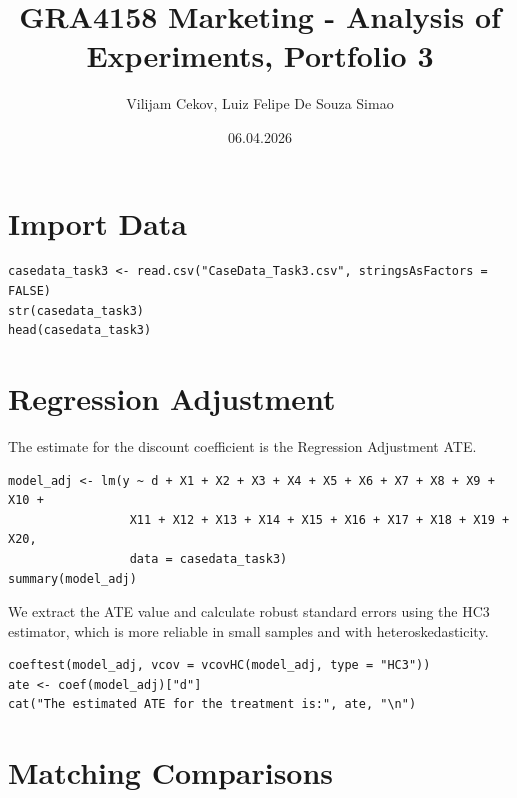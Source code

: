 \documentclass[12pt,a4paper]{article}
\title{GRA4158 Marketing - Analysis of Experiments, Portfolio 3}
\author{Vilijam Cekov, Luiz Felipe De Souza Simao}
\date{06.04.2026}
\begin{document}
\maketitle
\tableofcontents
\newpage

\section{Import Data}

\begin{lstlisting}
casedata_task3 <- read.csv("CaseData_Task3.csv", stringsAsFactors = FALSE)
str(casedata_task3)
head(casedata_task3)
\end{lstlisting}

\section{Regression Adjustment}

The estimate for the discount coefficient is the Regression Adjustment ATE.

\begin{lstlisting}
model_adj <- lm(y ~ d + X1 + X2 + X3 + X4 + X5 + X6 + X7 + X8 + X9 + X10 +
                 X11 + X12 + X13 + X14 + X15 + X16 + X17 + X18 + X19 + X20,
                 data = casedata_task3)
summary(model_adj)
\end{lstlisting}

We extract the ATE value and calculate robust standard errors using the HC3 estimator, which is more reliable in small samples and with heteroskedasticity.

\begin{lstlisting}
coeftest(model_adj, vcov = vcovHC(model_adj, type = "HC3"))
ate <- coef(model_adj)["d"]
cat("The estimated ATE for the treatment is:", ate, "\n")
\end{lstlisting}

\section{Matching Comparisons}
\end{document}
